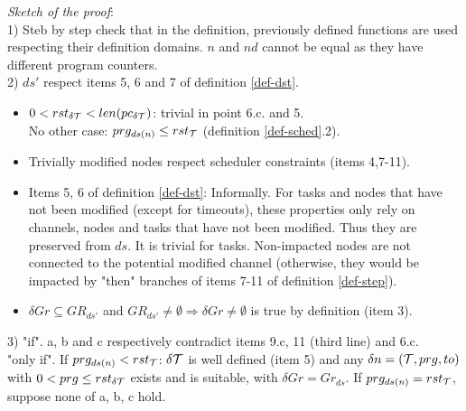 \documentclass{article}
\begin{document}
{\em Sketch of the proof}:\\ 1) Steb by step check that in the definition, previously defined functions are used respecting their definition domains. $n$ and $nd$ cannot be equal as they have different program counters.\\
2) $ds'$ respect items 5, 6 and 7 of definition \ref{def-dst}.
\begin{itemize}
\item $0 < rst_{\delta{\cal T}} < len(pc_{\delta{\cal T}})$: trivial in point 6.c. and 5.\\
      No other case: $prg_{ds(n)} \leq rst_{\cal T}$ (definition \ref{def-sched}.2).
\item Trivially modified nodes respect scheduler constraints (items 4,7-11).
\item Items 5, 6 of definition \ref{def-dst}: Informally. For tasks and nodes that have not been modified (except for timeouts), these properties only rely on channels, nodes and tasks that have not been modified. Thus they are preserved from $ds$. It is trivial for tasks. Non-impacted nodes are not connected to the potential modified channel (otherwise, they would be impacted by "then" branches of items 7-11 of definition \ref{def-step}).
\item $\delta Gr\subseteq GR_{ds'}$ and $GR_{ds'}\neq\emptyset\Rightarrow \delta Gr\neq\emptyset$ is true by definition (item 3).
\end{itemize}
3) "if". a, b and c respectively contradict items 9.c, 11 (third line) and 6.c.\\
"only if".  If $prg_{ds(n)} < rst_{\cal T}$: $\delta {\cal T}$ is well defined (item 5) and any $\delta n=({\cal T},prg,to)$ with $0<prg\leq rst_{\delta{\cal T}}$ exists and is suitable, with $\delta Gr=Gr_{ds}$.
If $prg_{ds(n)} = rst_{\cal T}$, suppose none of a, b, c hold.
\end{document}
